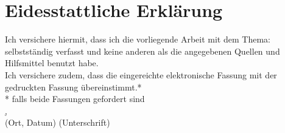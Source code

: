 \section*{Eidesstattliche Erklärung}
Ich versichere hiermit, dass ich die vorliegende Arbeit mit dem Thema: \emph{\thetitle} selbstständig verfasst und keine anderen als die angegebenen Quellen und Hilfsmittel benutzt habe. \\

Ich versichere zudem, dass die eingereichte elektronische Fassung mit der gedruckten Fassung übereinstimmt.* \\

* falls beide Fassungen gefordert sind
$\;$ \\
$\;$ \\
$\;$ \\
$\;$ \\
$\;$ \\
\underline{\universityCity, \dayOfCompletion \hspace{5mm}} \hspace{55mm} 
\underline{\hspace{50mm}} \\

(Ort, Datum) \hspace{75mm} (Unterschrift)
